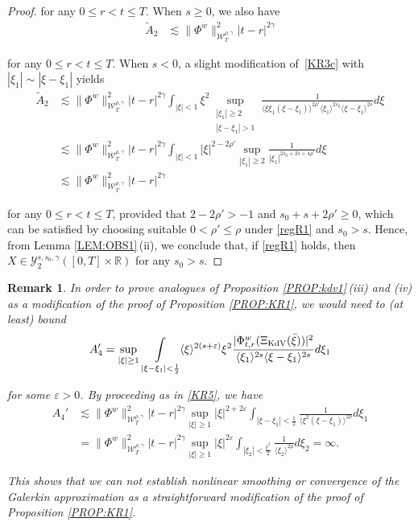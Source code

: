 \documentclass[letterpaper, 11pt,  reqno]{amsart}
\newtheorem{remark}[theorem]{Remark}
\DeclareMathOperator*{\intt}{\int}
\newcommand{\1}{\hspace{0.5mm}\text{I}\hspace{0.5mm}}
\newcommand{\noi}{\noindent}
\newcommand{\R}{\mathbb{R}}
\newcommand{\eps}{\varepsilon}
\newcommand{\g}{\gamma}
\newcommand{\wt}{\widetilde}
\newcommand{\les}{\lesssim}
\newcommand{\jb}[1]
{\langle #1 \rangle}
\newcommand{\cY}{\mathcal{Y}}
\newcommand{\W}{\mathcal{W}}
\newcommand{\KDV}{\text{\rm KdV} }
\numberwithin{equation}{section}
\numberwithin{theorem}{section}
\begin{document}
\begin{proof}
\noi
for any $0 \le r <  t \le T$.
When $s \ge 0$, we also have 
\begin{align*}
\wt A_2
& \les
\|\Phi^w\|^2_{\W_T^{\rho,\g}}|t-r |^{2\g}
\end{align*}

\noi
for any $0 \le r <  t \le T$.
When $s < 0$, 
a slight modification of~\eqref{KR3c} with $|\xi_1|\sim |\xi - \xi_1|$ yields
\begin{align*}
\wt A_2
& \les
\|\Phi^w\|_{\W^{\rho,\g}_T}^2
|t-r|^{2\g}
\intt_{|\xi|<1}  \xi^2 
\sup_{\substack{|\xi_1|\ge 2\\|\xi - \xi_1|> 1}}
\frac{1}{\jb {\xi \xi_1 (\xi-\xi_1)}^{2\rho'}\jb {\xi_1}^{2s_0} \jb {\xi-\xi_1}^{2s}} d\xi
\\
& \les 
\|\Phi^w\|_{\W^{\rho,\g}_T}^2
|t-r|^{2\g}
\intt_{|\xi|<1} |\xi|^{2-2\rho' } 
\sup_{|\xi_1|\ge 2}
\frac{1}{| \xi_1|^{2s_0+2s + 4\rho'} } d\xi\\
& \les 
\|\Phi^w\|_{\W^{\rho,\g}_T}^2
|t-r|^{2\g} 
\end{align*}

\noi
for any $0 \le r <  t \le T$, 
provided that $2-2\rho'>-1$ and $ s_0 + s+2\rho' \ge 0$, 
which can be satisfied by choosing 
suitable $0 < \rho' \le \rho$
under  \eqref{regR1} and  $s_0 > s$.
Hence,
from  Lemma \ref{LEM:OBS1}\,(ii),  
we conclude that, if \eqref{regR1} holds, 
then
 $X\in  \cY^{s, s_0, \g}_2([0, T]\times \R)$
 for any $s_0 > s$.
\end{proof}




\begin{remark}\label{REM:R1}\rm
In order to prove analogues of Proposition \ref{PROP:kdv1}\,(iii) and (iv)
as a modification of the proof of Proposition \ref{PROP:KR1}, 
we would need to 
(at least) bound
\begin{align*}
A_4' = \sup_{|\xi|\ge 1} 
  \intt_{|\xi - \xi_1|< \frac 12} 
  \jb{\xi}^{ 2(s+ \eps) }\xi^2
   \frac{|\Phi^{w}_{t,r} (\Xi_\KDV(\bar \xi)) |^2}{ \jb{\xi_1}^{2s}  \jb{\xi - \xi_1}^{2s}}  d\xi_1
\end{align*}

\noi
for some $\eps > 0$.
By proceeding as in \eqref{KR5}, we have
 \begin{align*}
A_4'
&\les
\|\Phi^w\|^2_{\W_T^{\rho,\g}}
|t-r |^{2\g }    \sup_{|\xi|\ge 1}  |\xi|^{2 + 2\eps}
  \intt_{|\xi - \xi_1|< \frac 12} 
\frac{ 1}{  \jb{\xi^2(\xi - \xi_1)}^{2\rho}} d \xi_1\\
& = 
\|\Phi^w\|^2_{\W_T^{\rho,\g}}
|t-r |^{2\g }  
    \sup_{|\xi|\ge 1}  |\xi|^{2\eps}
  \intt_{|\xi_2|< \frac {\xi^2}2} 
 \frac{1}{\jb{\xi_2}^{2\rho} }d \xi_2
 = \infty.
\end{align*}

\noi
This shows that 
we can not  establish nonlinear smoothing or convergence
of the Galerkin approximation
as a straightforward modification of the proof of Proposition \ref{PROP:KR1}.

\end{remark}
\end{document}
